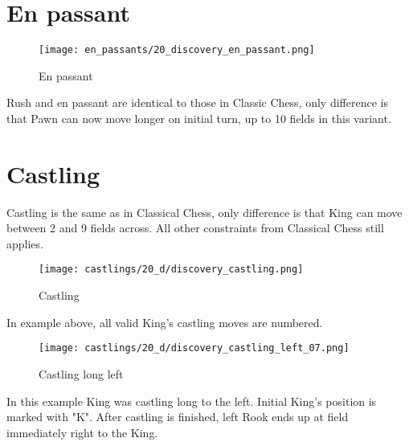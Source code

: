 \section*{En passant}

\noindent
\begin{wrapfigure}{l}{0.4\textwidth}
\centering
\texttt{[image: en\_passants/20\_discovery\_en\_passant.png]}
\caption{En passant}
\label{fig:20_discovery_en_passant}
\end{wrapfigure}
Rush and en passant are identical to those in Classic Chess, only difference
is that Pawn can now move longer on initial turn, up to 10 fields in this
variant.

\clearpage %

\section*{Castling}

Castling is the same as in Classical Chess, only difference is that King can move between 2 and 9 fields across.
All other constraints from Classical Chess still applies.

\noindent
\begin{figure}[!h]
\texttt{[image: castlings/20\_d/discovery\_castling.png]}
\caption{Castling}
\label{fig:discovery_castling}
\end{figure}

In example above, all valid King's castling moves are numbered.

\noindent
\begin{figure}[!h]
\texttt{[image: castlings/20\_d/discovery\_castling\_left\_07.png]}
\caption{Castling long left}
\label{fig:discovery_castling_left_07}
\end{figure}

In this example King was castling long to the left. Initial King's position is marked with "K".
After castling is finished, left Rook ends up at field immediately right to the King.

\clearpage %

